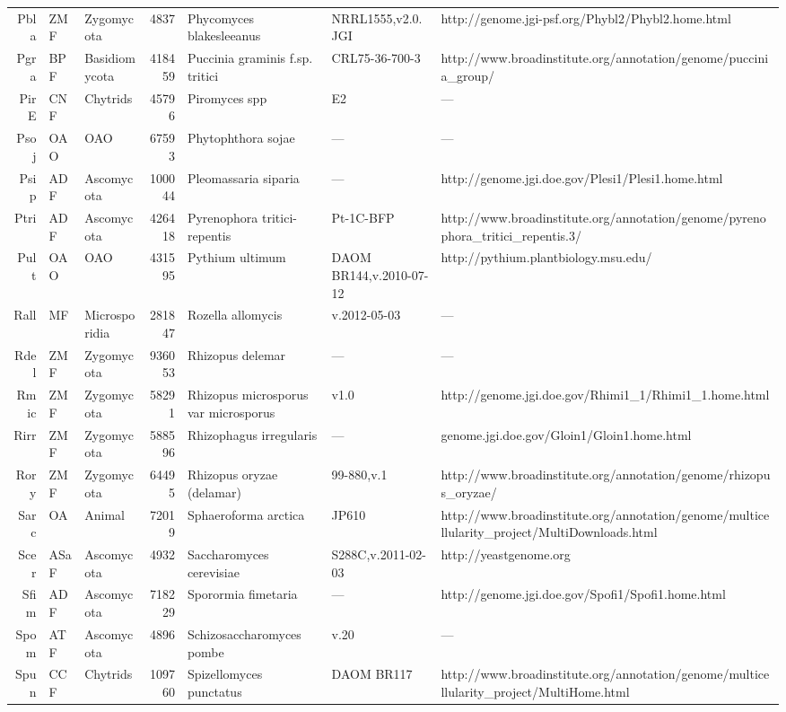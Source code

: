 {\begin{table}[tbp]
\begin{tabular}{rllrlll}
  Pbla & ZMF & Zygomycota & 4837 & Phycomyces blakesleeanus & NRRL1555,v2.0.JGI & http://genome.jgi-psf.org/Phybl2/Phybl2.home.html \\ 
  Pgra & BPF & Basidiomycota & 418459 & Puccinia graminis f.sp. tritici & CRL75-36-700-3 & http://www.broadinstitute.org/annotation/genome/puccinia\_group/ \\ 
  PirE & CNF & Chytrids & 45796 & Piromyces spp  & E2 & --- \\ 
  Psoj & OAO & OAO & 67593 & Phytophthora sojae & --- & --- \\ 
  Psip & ADF & Ascomycota & 100044 & Pleomassaria siparia & --- & http://genome.jgi.doe.gov/Plesi1/Plesi1.home.html \\ 
  Ptri & ADF & Ascomycota & 426418 & Pyrenophora tritici-repentis & Pt-1C-BFP & http://www.broadinstitute.org/annotation/genome/pyrenophora\_tritici\_repentis.3/ \\ 
  Pult & OAO & OAO & 431595 & Pythium ultimum & DAOM BR144,v.2010-07-12 & http://pythium.plantbiology.msu.edu/ \\ 
  Rall & MF & Microsporidia & 281847 & Rozella allomycis & v.2012-05-03 & --- \\ 
  Rdel & ZMF & Zygomycota & 936053 & Rhizopus delemar & --- & --- \\ 
  Rmic & ZMF & Zygomycota & 58291 & Rhizopus microsporus var microsporus & v1.0 & http://genome.jgi.doe.gov/Rhimi1\_1/Rhimi1\_1.home.html \\ 
  Rirr & ZMF & Zygomycota & 588596 & Rhizophagus irregularis & --- & genome.jgi.doe.gov/Gloin1/Gloin1.home.html \\ 
  Rory & ZMF & Zygomycota & 64495 & Rhizopus oryzae (delamar) & 99-880,v.1 & http://www.broadinstitute.org/annotation/genome/rhizopus\_oryzae/ \\ 
  Sarc & OA & Animal & 72019 & Sphaeroforma arctica  & JP610 & http://www.broadinstitute.org/annotation/genome/multicellularity\_project/MultiDownloads.html \\ 
  Scer & ASaF & Ascomycota & 4932 & Saccharomyces cerevisiae & S288C,v.2011-02-03 & http://yeastgenome.org \\ 
  Sfim & ADF & Ascomycota & 718229 & Sporormia fimetaria & --- & http://genome.jgi.doe.gov/Spofi1/Spofi1.home.html \\ 
  Spom & ATF & Ascomycota & 4896 & Schizosaccharomyces pombe & v.20 & --- \\ 
  Spun & CCF & Chytrids & 109760 & Spizellomyces punctatus & DAOM BR117 & http://www.broadinstitute.org/annotation/genome/multicellularity\_project/MultiHome.html \\ 

\end{tabular}
\end{table}}
